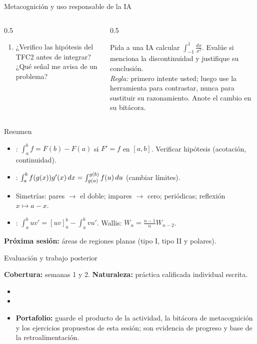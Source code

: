 \documentclass[10pt,aspectratio=169]{beamer}
\begin{document}
\begin{frame}{Metacognición y uso responsable de la IA}
  \small
  \begin{columns}[t]
    \begin{column}{0.5\textwidth}
      \begin{metacog}
        \begin{enumerate}
          \metacomun
          \item ¿Verifico las hipótesis del TFC2 antes de integrar? ¿Qué señal me avisa de un problema?
        \end{enumerate}
      \end{metacog}
    \end{column}
    \begin{column}{0.5\textwidth}
      \begin{iabox}
        Pida a una IA calcular $\int_{-1}^1\frac{dx}{x^2}$. Evalúe si menciona la discontinuidad y justifique su conclusión.\\[2pt]
        \textit{Regla:} primero intente usted; luego use la herramienta para contrastar, nunca para sustituir su razonamiento. Anote el cambio en su bitácora.
      \end{iabox}
    \end{column}
  \end{columns}
\end{frame}

\begin{frame}{Resumen}
  \begin{itemize}
    \item {}: $\int_a^bf=F(b)-F(a)$ si $F'=f$ en $[a,b]$. Verificar hipótesis (acotación, continuidad).
    \item {}: $\int_a^bf(g(x))g'(x)\,dx=\int_{g(a)}^{g(b)}f(u)\,du$ (cambiar límites).
    \item Simetrías: pares $\to$ el doble; impares $\to$ cero; periódicas; reflexión $x\mapsto a-x$.
    \item {}: $\int_a^buv'=[uv]_a^b-\int_a^bvu'$. Wallis: $W_n=\frac{n-1}{n}W_{n-2}$.
  \end{itemize}
  \vspace{3mm}
  \textbf{Próxima sesión:} áreas de regiones planas (tipo I, tipo II y polares).
\end{frame}


\begin{frame}{Evaluación y trabajo posterior}
  \small
  \begin{evalbox}
    \textbf{Cobertura:} semanas 1 y 2. \textbf{Naturaleza:} práctica calificada individual escrita.
  \end{evalbox}
  \begin{itemize}
    \item \criterios
    \item \declaracionia
    \item \textbf{Portafolio:} guarde el producto de la actividad, la bitácora de metacognición y los ejercicios propuestos de esta sesión; son evidencia de progreso y base de la retroalimentación.
  \end{itemize}
\end{frame}
\end{document}
